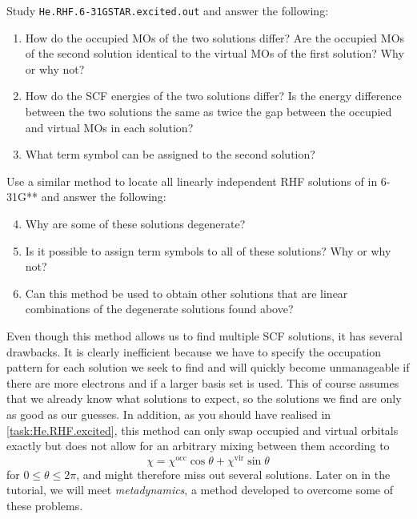 				\begin{Task}
					\label{task:He.RHF.excited}
					Study \texttt{He.RHF.6-31GSTAR.excited.out} and answer the following:
						\begin{enumerate}[topsep=0pt,itemsep=-1ex,partopsep=1ex,parsep=1ex,label=(\alph*)]
							\item How do the occupied MOs of the two solutions differ? Are the occupied MOs of the second solution identical to the virtual MOs of the first solution? Why or why not?
							\item How do the SCF energies of the two solutions differ? Is the energy difference between the two solutions the same as twice the gap between the occupied and virtual MOs in each solution?
							\item What term symbol can be assigned to the second solution?
						\end{enumerate}
					Use a similar method to locate all linearly independent RHF solutions of  in 6-31G** and answer the following:
						\begin{enumerate}[topsep=0pt,itemsep=-1ex,partopsep=1ex,parsep=1ex,label=(\alph*)]
							\setcounter{enumi}{3}
							\item Why are some of these solutions degenerate?
							\item Is it possible to assign term symbols to all of these solutions? Why or why not?
							\item Can this method be used to obtain other solutions that are linear combinations of the degenerate solutions found above?
						\end{enumerate}
				\end{Task}
			
			Even though this method allows us to find multiple SCF solutions, it has several drawbacks.
			It is clearly inefficient because we have to specify the occupation pattern for each solution we seek to find and will quickly become unmanageable if there are more electrons and if a larger basis set is used.
			This of course assumes that we already know what solutions to expect, so the solutions we find are only as good as our guesses.
			In addition, as you should have realised in \cref{task:He.RHF.excited}, this method can only swap occupied and virtual orbitals exactly but does not allow for an arbitrary mixing between them according to
				\begin{equation*}
					\chi = \chi^\mathrm{occ} \cos\theta + \chi^\mathrm{vir} \sin\theta
				\end{equation*}
			for $0 \leq \theta \leq 2\pi$, and might therefore miss out several solutions.
			Later on in the tutorial, we will meet \textit{metadynamics}, a method developed to overcome some of these problems\autocite{article:Thom2008}.
			
